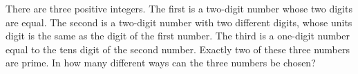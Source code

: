There are three positive integers. The first is a two-digit number whose two digits are equal. The second is a two-digit number with two different digits, whose units digit is the same as the digit of the first number. The third is a one-digit number equal to the tens digit of the second number. Exactly two of these three numbers are prime. In how many different ways can the three numbers be chosen?
